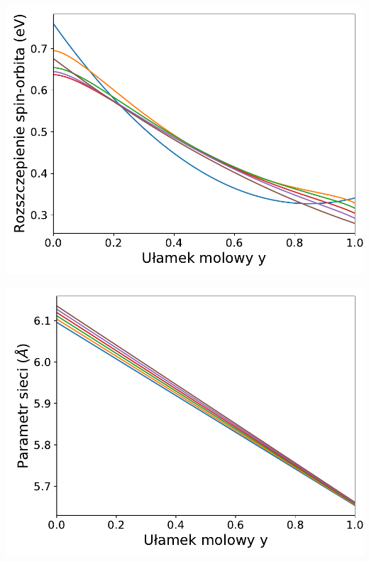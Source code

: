 \documentclass[12pt,openany,a4paper]{book}
\begin{document}
\begin{minipage}[t]{0.5\textwidth}
	\includegraphics[width = \linewidth]{Figures/quaternary/quat_delta_so_x.pdf}\label{fig:quat_delta_so_x}
\end{minipage}
\begin{minipage}[t]{0.5\textwidth}
	\includegraphics[width = \linewidth]{Figures/quaternary/quat_alc_x.pdf}\label{fig:quat_alc_x}
\end{minipage}
\end{document}
